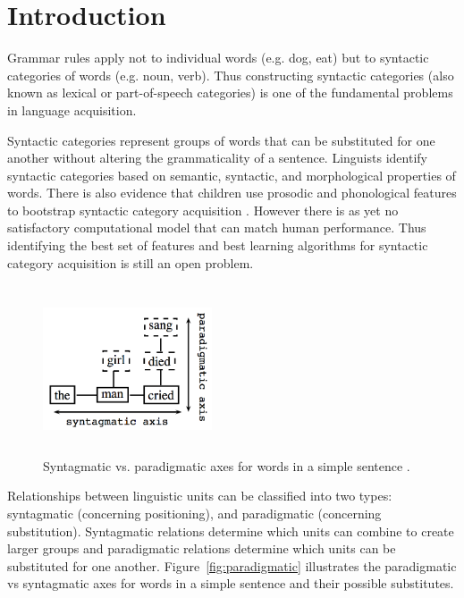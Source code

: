 \section{Introduction}
\label{sec:intro}

Grammar rules apply not to individual words (e.g. dog, eat) but to
syntactic categories of words (e.g. noun, verb).  Thus constructing
syntactic categories (also known as lexical or part-of-speech
categories) is one of the fundamental problems in language
acquisition.

Syntactic categories represent groups of words that can be substituted
for one another without altering the grammaticality of a sentence.
Linguists identify syntactic categories based on semantic, syntactic,
and morphological properties of words.  There is also evidence that
children use prosodic and phonological features to bootstrap syntactic
category acquisition \cite{ambridge2011child}.  However there is as
yet no satisfactory computational model that can match human
performance.  Thus identifying the best set of features and best
learning algorithms for syntactic category acquisition is still an
open problem.

\begin{figure}[b] 
  \centering
  \includegraphics[height=50mm,width=50mm]{paradigmatic.png}
%  
  \caption{Syntagmatic vs. paradigmatic axes for words in a simple
    sentence \protect\cite{chandler2007semiotics}.}
\end{figure}

Relationships between linguistic units can be classified into two
types: syntagmatic (concerning positioning), and paradigmatic
(concerning substitution).  Syntagmatic relations determine which
units can combine to create larger groups and paradigmatic relations
determine which units can be substituted for one another.
Figure~\ref{fig:paradigmatic} illustrates the paradigmatic vs
syntagmatic axes for words in a simple sentence and their possible
substitutes.  

